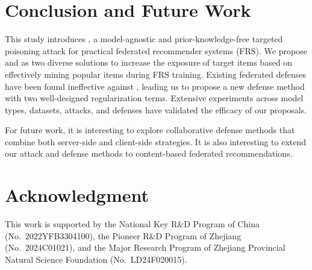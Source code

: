 \section{Conclusion and Future Work}

This study introduces \model{}, a model-agnostic and prior-knowledge-free targeted poisoning attack for practical federated recommender systems (FRS). 
We propose \modelI{} and \modelII{} as two diverse solutions to increase the exposure of target items based on effectively mining popular items during FRS training. Existing federated defenses have been found ineffective against \model{}, leading us to propose a new defense method with two well-designed regularization terms. Extensive experiments across model types, datasets, attacks, and defenses have validated the efficacy of our proposals.

For future work, it is interesting to explore collaborative defense methods that combine both server-side and client-side strategies. 
It is also interesting to extend our attack and defense methods to content-based federated recommendations.

\section*{Acknowledgment}
This work is supported by the National Key R\&D Program of China (No.~2022YFB3304100), the Pioneer R\&D Program of Zhejiang (No.~2024C01021), and the Major Research Program of Zhejiang Provincial Natural Science Foundation (No.~LD24F020015).
